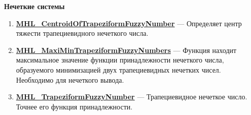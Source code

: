 \documentclass[a4paper,12pt]{article}
\begin{document}
\textbf{Нечеткие системы}
\begin{enumerate}

\item \textbf{\hyperref[MHL_CentroidOfTrapeziformFuzzyNumber]{MHL\_CentroidOfTrapeziformFuzzyNumber}} --- Определяет центр тяжести трапециевидного нечеткого числа.

\item \textbf{\hyperref[MHL_MaxiMinTrapeziformFuzzyNumbers]{MHL\_MaxiMinTrapeziformFuzzyNumbers}} --- Функция находит максимальное значение функции принадлежности нечеткого числа, образуемого минимизацией двух трапециевидных нечетких чисел. Необходимо для нечеткого вывода.

\item \textbf{\hyperref[MHL_TrapeziformFuzzyNumber]{MHL\_TrapeziformFuzzyNumber}} --- Трапециевидное нечеткое число. Точнее его функция принадлежности.

\end{enumerate}
\end{document}
